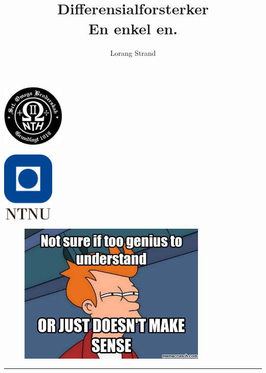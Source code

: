 
\title{%
    \textbf{Differensialforsterker} \\
    \large{En enkel en.}}
\author{Lorang Strand}

\begin{minipage}[c]{0.20\textwidth}
    \includegraphics[width=3cm]{Bilder/Omega_logo.png}  
\end{minipage}
\begin{minipage}[c]{0.60\textwidth}

    \maketitle

\end{minipage}
\begin{minipage}[c]{0.20\textwidth}
    \includegraphics[width=2.5cm]{Bilder/NTNU logo.png}  
\end{minipage}


\vfill
\begin{figure}[H]
    \centering
    \includegraphics[width=0.8\textwidth]{Bilder/Futurama_meme.jpg}
\end{figure}



\vfill      %
\setlength{\parskip}{0ex}
\renewcommand{\baselinestretch}{0.1}\normalsize
\tableofcontents
\renewcommand{\baselinestretch}{1.00}\normalsize
\setlength{\parskip}{2ex}
\rule{\textwidth}{1pt}
\newpage


